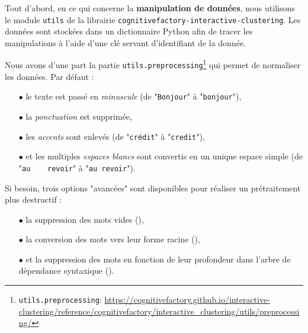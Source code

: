 		Tout d'abord, en ce qui concerne la \textbf{manipulation de données}, nous utilisons le module \texttt{utils} de la librairie \texttt{cognitivefactory-interactive-clustering}.
		Les données sont stockées dans un dictionnaire Python afin de tracer les manipulations à l'aide d'une clé servant d'identifiant de la donnée.
		
		Nous avons d'une part la partie \texttt{utils.preprocessing}\footnote{
			\texttt{utils.preprocessing}: \url{https://cognitivefactory.github.io/interactive-clustering/reference/cognitivefactory/interactive_clustering/utils/preprocessing/}
		} qui permet de normaliser les données.
		Par défaut :
		\begin{itemize}
			\item[\(\bullet\)] le texte est passé en \textit{minuscule} (de "\texttt{Bonjour}" à "\texttt{bonjour}"),
			\item[\(\bullet\)] la \textit{ponctuation} est supprimée, %
			\item[\(\bullet\)] les \textit{accents} sont enlevés (de "\texttt{crédit}" à "\texttt{credit}"),
			\item[\(\bullet\)] et les multiples \textit{espaces blancs} sont convertis en un unique espace simple (de "\texttt{au~~~~revoir}" à "\texttt{au revoir}").
		\end{itemize}
		
		Si besoin, trois options "avancées" sont disponibles pour réaliser un prétraitement plus destructif :
		\begin{itemize}
			\item[\(\bullet\)] la suppression des mots vides (\cite{nothman-etal:2018:stop-word-lists}),
			\item[\(\bullet\)] la conversion des mots vers leur forme racine (\cite{manning-schutze:2000:foundations-statistical-natural}),
			\item[\(\bullet\)] et la suppression des mots en fonction de leur profondeur dans l'arbre de dépendance syntaxique (\cite{nivre:2006:inductive-dependency-parsing}).
		\end{itemize}
		
